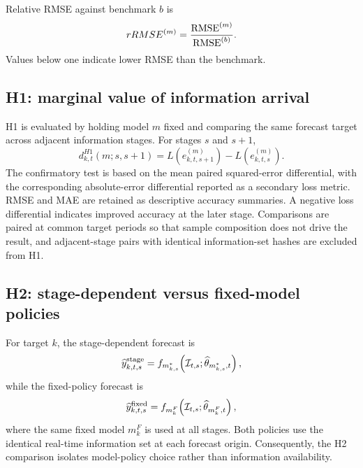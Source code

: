 Relative RMSE against benchmark $b$ is
\begin{equation}
    rRMSE^{(m)}
    =
    \frac{\operatorname{RMSE}^{(m)}}{\operatorname{RMSE}^{(b)}}.
    \label{eq:relative_rmse}
\end{equation}
Values below one indicate lower RMSE than the benchmark.

\subsection{H1: marginal value of information arrival}
\label{subsec:h1_design}

H1 is evaluated by holding model $m$ fixed and comparing the same forecast target across adjacent information stages. For stages $s$ and $s+1$,
\begin{equation}
    d_{k,t}^{H1}(m;s,s+1)
    =
    L\!\left(e_{k,t,s+1}^{(m)}\right)
    -
    L\!\left(e_{k,t,s}^{(m)}\right).
    \label{eq:h1_experiment_diff}
\end{equation}
The confirmatory test is based on the mean paired squared-error differential, with the corresponding absolute-error differential reported as a secondary loss metric. RMSE and MAE are retained as descriptive accuracy summaries. A negative loss differential indicates improved accuracy at the later stage. Comparisons are paired at common target periods so that sample composition does not drive the result, and adjacent-stage pairs with identical information-set hashes are excluded from H1.

\subsection{H2: stage-dependent versus fixed-model policies}
\label{subsec:h2_design}

For target $k$, the stage-dependent forecast is
\begin{equation}
    \widehat{y}_{k,t,s}^{\mathrm{stage}}
    =
    f_{m^*_{k,s}}\!\left(\mathcal{I}_{t,s};\widehat{\theta}_{m^*_{k,s},t}\right),
    \label{eq:h2_stage_forecast}
\end{equation}
while the fixed-policy forecast is
\begin{equation}
    \widehat{y}_{k,t,s}^{\mathrm{fixed}}
    =
    f_{m_k^{F}}\!\left(\mathcal{I}_{t,s};\widehat{\theta}_{m_k^{F},t}\right),
    \label{eq:h2_fixed_forecast}
\end{equation}
where the same fixed model $m_k^{F}$ is used at all stages. Both policies use the identical real-time information set at each forecast origin. Consequently, the H2 comparison isolates model-policy choice rather than information availability.

